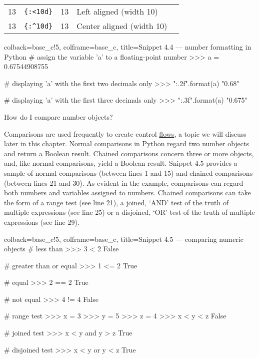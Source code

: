 \documentclass[a4paper,11pt]{book}
\numberwithin{figure}{chapter}
\numberwithin{table}{chapter}
\newcommand{\question}[1]{%
    \begin{tcolorbox}[colback=comp_c!10,colframe=comp_c,sidebyside align=top,width=\linewidth,before skip=1ex]
        #1
    \end{tcolorbox}%
    \switchcolumn%
}
\newcommand{\note}[1]{%
    \begin{tcolorbox}[colback=white!0,colframe=white!10,width=\linewidth,before skip=1ex]
        #1
    \end{tcolorbox}         
}
\begin{document}
\begin{table}[!htbp]
\begin{tabular}{cccll}
		13                                  & \texttt{\{:\textless{}10d\}}                 & \multicolumn{1}{l}{13}                                  & Left aligned (width 10)                       &  \\
		13                                  & \texttt{\{:\textasciicircum{}10d\}}          & 13                                  & Center aligned (width 10)           \\
		\bottomrule
	\end{tabular}
\end{table}

\begin{pythoncode}[linenos=true,]{colback=base_c!5, colframe=base_c, title=\sffamily Snippet 4.4 --- number formatting in Python}
# assign the variable 'a' to a floating-point number
>>> a = 0.67544908755

# displaying 'a' with the first two decimals only
>>> "{:.2f}".format(a)
"0.68"

# displaying 'a' with the first three decimals only
>>> "{:.3f}".format(a)
"0.675"
\end{pythoncode}

\begin{paracol}{2}
	\question{\raggedright{How do I compare number objects?}}
	\note{Comparisons are used frequently to create control \href{https://docs.python.org/3/tutorial/controlflow.html}{flows}, a topic we will discuss later in this chapter. Normal comparisons in Python regard two number objects and return a Boolean result. Chained comparisons concern three or more objects, and, like normal comparisons, yield a Boolean result. Snippet 4.5 provides a sample of normal comparisons (between lines 1 and 15) and chained comparisons (between lines 21 and 30). As evident in the example, comparisons can regard both numbers and variables assigned to numbers. Chained comparisons can take the form of a range test (see line 21), a joined, `AND' test of the truth of multiple expressions (see line 25) or a disjoined, `OR' test of the truth of multiple expressions (see line 29).}
\end{paracol}
\clearpage

\begin{pythoncode}[linenos=true,]{colback=base_c!5, colframe=base_c, title=\sffamily Snippet 4.5 --- comparing numeric objects}
# less than
>>> 3 < 2
False

# greater than or equal
>>> 1 <= 2
True

# equal
>>> 2 == 2
True 

# not equal
>>> 4 != 4
False

# range test
>>> x = 3
>>> y = 5
>>> z = 4
>>> x < y < z
False

# joined test
>>> x < y and y > z
True

# disjoined test
>>> x < y or y < z
True 

\end{pythoncode}
\end{document}
